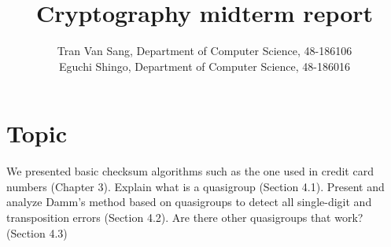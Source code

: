 \documentclass[10pt]{report}
\begin{document}
\title{Cryptography midterm report}
\author{Tran Van Sang, Department of Computer Science, 48-186106\\
Eguchi Shingo, Department of Computer Science, 48-186016}
\maketitle
\tableofcontents

\chapter*{Topic}
We presented basic checksum algorithms such as the one used in credit card numbers (Chapter 3). Explain what is a quasigroup (Section 4.1). Present and analyze Damm’s method based on quasigroups to detect all single-digit and transposition errors (Section 4.2). Are there other quasigroups that work? (Section 4.3)




% 
% 

%
\end{document}
